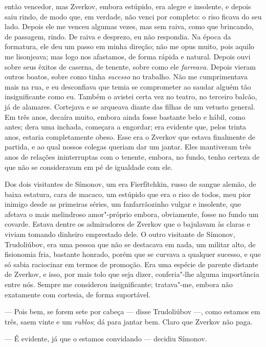 então vencedor, mas Zverkov, embora estúpido, era alegre e insolente, e
depois saiu rindo, de modo que, em verdade, não venci por completo: o
riso ficava do seu lado. Depois ele me venceu algumas vezes, mas sem
raiva, como que brincando, de passagem, rindo. De raiva e desprezo, eu
não respondia. Na época da formatura, ele deu um passo em minha direção;
não me opus muito, pois aquilo me lisonjeava; mas logo nos afastamos, de
forma rápida e natural. Depois ouvi sobre seus êxitos de caserna, de
tenente, sobre como ele \emph{farreava.} Depois vieram outros boatos,
sobre como tinha \emph{sucesso} no trabalho. Não me cumprimentava mais
na rua, e eu desconfiava que temia se comprometer ao saudar alguém tão
insignificante como eu. Também o avistei certa vez no teatro, no
terceiro balcão, já de alamares. Cortejava e se arqueava diante das
filhas de um vetusto general. Em três anos, decaíra muito, embora ainda
fosse bastante belo e hábil, como antes; dera uma inchada, começara a
engordar; era evidente que, pelos trinta anos, estaria completamente
obeso. Esse era o Zverkov que estava finalmente de partida, e ao qual
nossos colegas queriam dar um jantar. Eles mantiveram três anos de
relações ininterruptas com o tenente, embora, no fundo, tenho certeza de
que não se consideravam em pé de igualdade com ele.

Dos dois visitantes de Símonov, um era Fierfítchkin, russo de sangue
alemão, de baixa estatura, cara de macaco, um estúpido que era o riso de
todos, meu pior inimigo desde as primeiras séries, um fanfarrãozinho
vulgar e insolente, que afetava o mais melindroso amor"-próprio embora,
obviamente, fosse no fundo um covarde. Estava dentre os admiradores de
Zverkov que o bajulavam às claras e viviam tomando dinheiro emprestado
dele. O outro visitante de Símonov, Trudoliúbov, era uma pessoa que não
se destacava em nada, um militar alto, de fisionomia fria, bastante
honrado, porém que se curvava a qualquer sucesso, e que só sabia
raciocinar em termos de promoção. Era uma espécie de parente distante de
Zverkov, e isso, por mais tolo que seja dizer, conferia"-lhe alguma
importância entre nós. Sempre me considerou insignificante; tratava"-me,
embora não exatamente com cortesia, de forma suportável.

--- Pois bem, se forem sete por cabeça --- disse Trudoliúbov ---, como
estamos em três, saem vinte e um \emph{rublos}; dá para jantar bem.
Claro que Zverkov não paga.

--- É evidente, já que o estamos convidando --- decidiu Símonov.

